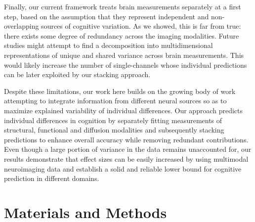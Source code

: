 \documentclass[10pt,letterpaper]{article}
\begin{document}
Finally, our current framework treats brain measurements separately at a first step, based on the assumption that they represent independent and non-overlapping sources of cognitive variation. As we showed, this is far from true: there exists some degree of redundancy across the imaging modalities. Future studies might attempt to find a decomposition into multidimensional representations of unique and shared variance across brain measurements. This would likely increase the number of single-channels whose individual predictions can be later exploited by our stacking approach. 

Despite these limitations, our work here builds on the growing body of work attempting to integrate information from different neural sources so as to maximize explained variability of individual differences. Our approach predicts individual differences in cognition by separately fitting measurements of structural, functional and diffusion modalities and subsequently stacking predictions to enhance overall accuracy while removing redundant contributions. Even though a large portion of variance in the data remains unaccounted for, our results demonstrate that effect sizes can be easily increased by using multimodal neuroimaging data and establish a solid and reliable lower bound for cognitive prediction in different domains.

\section*{Materials and Methods} \label{sec:methods}
\end{document}
